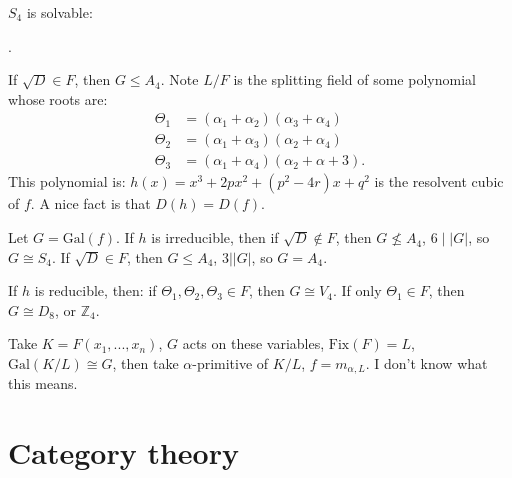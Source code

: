 \documentclass[9pt,reqno,twoside]{amsbook}
\theoremstyle{plain}
\numberwithin{section}{chapter}
\numberwithin{equation}{chapter}
\theoremstyle{definition}
\theoremstyle{remark}
\theoremstyle{plain}
\newcommand{\z}{\mathbb{Z}}
\newcommand{\bb}{\vspace{3mm}}
\newcommand{\bee}{\begin{equation}\begin{aligned}}
\newcommand{\eee}{\end{aligned}\end{equation}}
\newcommand{\gal}{\mathrm{Gal}}
\newcommand{\fix}{\mathrm{Fix}}
\newcommand{\qwe}{\sqrt}
\renewcommand{\leq}{\leqslant}
\begin{document}
$S_4$ is solvable: 
\begin{center}
.
\end{center}
If $\qwe{D} \in F$, then $G \leq A_4$.  Note $L/F$ is the splitting field of some polynomial whose roots are:
\bee
\Theta_1 &= (\alpha_1 + \alpha_2)(\alpha_3 + \alpha_4)\\
\Theta_2 &= (\alpha_1 + \alpha_3)(\alpha_2 + \alpha_4)\\
\Theta_3 &= (\alpha_1 + \alpha_4)(\alpha_2 + \alpha+3).
\eee
This polynomial is: $h(x) = x^3 + 2px^2 + (p^2 - 4r)x + q^2$ is the resolvent cubic of $f$. A nice fact is that $D(h) = D(f)$. 



\bb

Let $G = \gal(f)$. If $h$ is irreducible, then if $\qwe{D} \notin F$, then $G \nleq A_4$, $6 \mid |G|$, so $G \cong S_4$. If $\qwe{D} \in F$, then $G \leq A_4$, $3||G|$, so $G = A_4$. 

If $h$ is reducible, then: if $\Theta_1,\Theta_2,\Theta_3 \in F$, then $G \cong V_4$. If only $\Theta_1 \in F$, then $G \cong D_8$, or $\z_4$. 

Take $K = F(x_1,...,x_n)$, $G$ acts on these variables, $\fix(F) = L$, $\gal(K/L) \cong G$, then take $\alpha$-primitive of $K/L$, $f = m_{\alpha,L}$. I don't know what this means. 



















\appendix
%




\chapter{Category theory}
\end{document}
